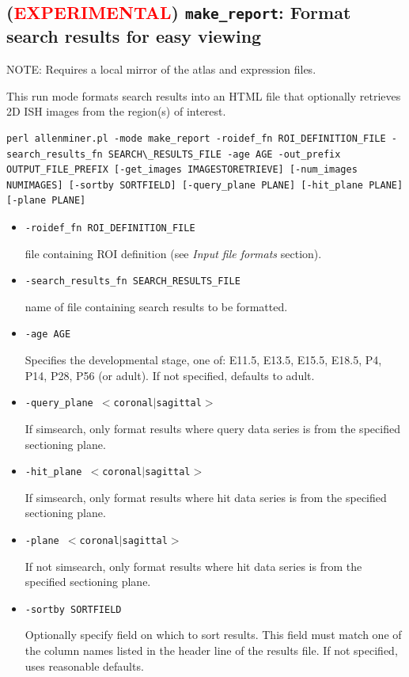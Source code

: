 \documentclass[10pt]{article}
\begin{document}
\subsection{(\textcolor{red}{EXPERIMENTAL}) {\tt make\_report}: Format search results for easy viewing}
NOTE: Requires a local mirror of the atlas and expression files.

This run mode formats search results into an HTML file that optionally retrieves 2D ISH images from the region(s) of interest.

\begin{lstlisting}
perl allenminer.pl -mode make_report -roidef_fn ROI_DEFINITION_FILE -search_results_fn SEARCH\_RESULTS_FILE -age AGE -out_prefix OUTPUT_FILE_PREFIX [-get_images IMAGESTORETRIEVE] [-num_images NUMIMAGES] [-sortby SORTFIELD] [-query_plane PLANE] [-hit_plane PLANE] [-plane PLANE]
\end{lstlisting}

\begin{itemize}
\item {\tt -roidef\_fn ROI\_DEFINITION\_FILE}

file containing ROI definition (see {\it Input file formats} section).

\item {\tt -search\_results\_fn SEARCH\_RESULTS\_FILE}

name of file containing search results to be formatted.

\item {\tt -age AGE}

Specifies the developmental stage, one of: E11.5, E13.5, E15.5, E18.5, P4, P14, P28, P56 (or adult). If not specified, defaults to adult.

\item {\tt -query\_plane $<$coronal$|$sagittal$>$}

If simsearch, only format results where query data series is from the specified sectioning plane.

\item {\tt -hit\_plane $<$coronal$|$sagittal$>$}

If simsearch, only format results where hit data series is from the specified sectioning plane.

\item {\tt -plane $<$coronal$|$sagittal$>$}

If not simsearch, only format results where hit data series is from the specified sectioning plane.

\item {\tt -sortby SORTFIELD}

Optionally specify field on which to sort results. This field must match one of the column names listed in the header line of the results file. If not specified, uses reasonable defaults.

\end{itemize}
\end{document}
